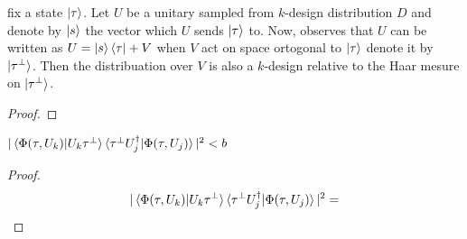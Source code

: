 \documentclass[manuscript,screen,review]{acmart}
\begin{document}
\begin{claim}
  fix a state $\ket{\tau}$. Let $U$ be a unitary sampled from $k$-design  distribution $D$ and denote by $\ket{s}$ the vector which $U$ sends $\ket{\tau}$ to. Now, observes that $U$ can be written as $U = \ket{s}\bra{\tau} + V$ when $V$ act on space ortogonal to $ \ket{\tau}$ denote it by $\ket{\tau^{\perp}}$. Then the distribuation over $V$ is also a $k$-design relative to the Haar mesure on $\ket{\tau^{\perp}}$. 
\end{claim}
\begin{proof}  
\end{proof}

\begin{claim}
  $|\braket{\Phi(\tau,U_{k})|U_{k}\tau^{\perp}}\braket{\tau^{\perp}U^{\dagger}_{j}|\Phi(\tau,U_{j})}|^{2} < b$
\end{claim}
\begin{proof}
  
  \begin{equation*}
    \begin{split}
      |\braket{\Phi(\tau,U_{k})|U_{k}\tau^{\perp}}\braket{\tau^{\perp}U^{\dagger}_{j}|\Phi(\tau,U_{j})}|^{2} &=  \\ 
    \end{split}
  \end{equation*}
\end{proof}
\printbibliography
\end{document}
